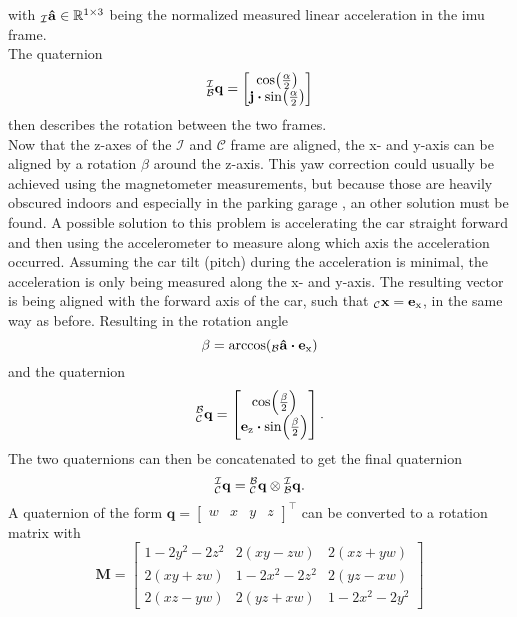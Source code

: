 with $\vincs{\vu{a}}{i} \in \mathbb{R}^{1\times3}$ being the normalized measured linear acceleration in the \gls{imu} frame.\\
The quaternion
\begin{equation}
    \qtf{i}{b} =
    \begin{bmatrix}
        \cos(\frac{\alpha}{2})\\
        \vb{j}\vdot\sin(\frac{\alpha}{2})
    \end{bmatrix}
\end{equation}
then describes the rotation between the two frames.\\
Now that the z-axes of the $\mathcal{I}$ and $\mathcal{C}$ frame are aligned, the x- and y-axis can be aligned by a rotation $\beta$ around the z-axis.
This yaw correction could usually be achieved using the magnetometer measurements, but because those are heavily obscured indoors and especially in the parking garage \cite{Li2012}, an other solution must be found.
A possible solution to this problem is accelerating the car straight forward and then using the accelerometer to measure along which axis the acceleration occurred.
Assuming the car tilt (pitch) during the acceleration is minimal, the acceleration is only being measured along the x- and y-axis.
The resulting vector is being aligned with the forward axis of the car, such that $\vincs{x}{c} = \mathbf{e}_\mathrm{x}$, in the same way as before.
Resulting in the rotation angle
\begin{equation}
    \beta = \arccos(\vincs{\vu{a}}{b} \vdot \vb{e}_\mathrm{x})
\end{equation}
and the quaternion
\begin{equation}
    \qtf{b}{c} =
    \begin{bmatrix}
        \cos(\frac{\beta}{2})\\
        \vb{e}_\mathrm{z}\vdot\sin(\frac{\beta}{2})
    \end{bmatrix}.
\end{equation}
The two quaternions can then be concatenated to get the final quaternion
\begin{equation}
    \qtf{i}{c} = \qtf{b}{c} \otimes  \qtf{i}{b}.
\end{equation}
A quaternion of the form
$\mathbf{q} = \left[\begin{array}{llll} w & x & y & z \end{array}\right]^{\top}$
can be converted to a rotation matrix with
\begin{equation}
    \mathbf{M} =
    \left[
        \begin{array}{ccc}
            1-2 y^{2}-2 z^{2} & 2(x y-z w) & 2(x z+y w) \\
            2(x y+z w) & 1-2 x^{2}-2 z^{2} & 2(y z-x w) \\
            2(x z-y w) & 2(y z+x w) & 1-2 x^{2}-2 y^{2}
        \end{array}
        \right]
    \end{equation}
